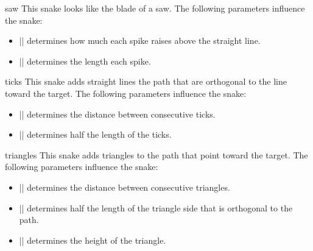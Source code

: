\begin{snake}{saw}
  This snake looks like the blade of a saw. The following parameters
  influence the snake:
  \begin{itemize}
  \item |\pgfsnakesegmentamplitude|
    determines how much each spike raises above the straight line.
  \item |\pgfsnakesegmentlength|
    determines the length each spike.
  \end{itemize}
\begin{codeexample}[]
\end{codeexample}
\end{snake}




\begin{snake}{ticks}
  This snake adds straight lines  the path that are orthogonal to the
  line toward the target. The following parameters influence the snake: 
  \begin{itemize}
  \item |\pgfsnakesegmentlength|
    determines the distance between consecutive ticks.
  \item |\pgfsnakesegmentamplitude|
    determines half the length of the ticks.
  \end{itemize}
\begin{codeexample}[]
\end{codeexample}
\end{snake}
\begin{snake}{triangles}
  This snake adds triangles to the path that point toward the
  target. The following parameters influence the snake: 
  \begin{itemize}
  \item |\pgfsnakesegmentlength|
    determines the distance between consecutive triangles.
  \item |\pgfsnakesegmentamplitude|
    determines half the length of the triangle side that is orthogonal
    to the path.
  \item |\pgfsnakesegmentobjectlength|
    determines the height of the triangle.
  \end{itemize}
\begin{codeexample}[]
\end{codeexample}
\end{snake}


